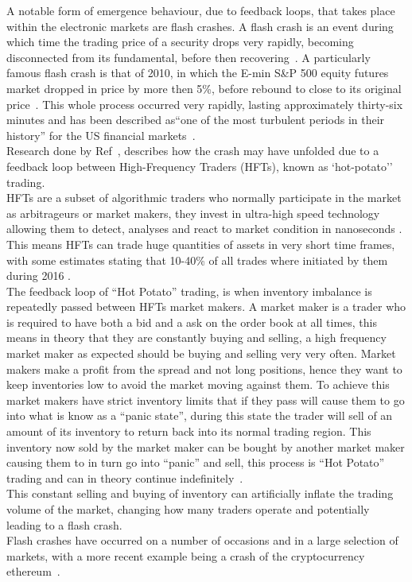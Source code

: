 \documentclass{article}
\begin{document}
A notable form of emergence behaviour, due to feedback loops, that takes place within the electronic markets are flash crashes. A flash crash is an event during which time the trading price of a security drops very rapidly, becoming disconnected from its fundamental, before then recovering~\cite{rareeventflashcrash}. A particularly famous flash crash is that of 2010, in which the E-min S\&P 500 equity futures market dropped in price by more then 5\%, before rebound to close to its original price~\cite{SECreport_delays, rareeventflashcrash}. This whole process occurred very rapidly, lasting approximately thirty-six minutes and has been described as``one of the most turbulent periods in their history'' for the US financial markets~\cite{Impact_hft}.\\
Research done by Ref~\cite{DynamicCoupling_Chris, otherabmflash}, describes how the crash may have unfolded due to a feedback loop between High-Frequency Traders (HFTs), known as `hot-potato'' trading.\\
HFTs are a subset of algorithmic traders who normally participate in the market as arbitrageurs or market makers, they invest in ultra-high speed technology allowing them to detect, analyses and react to market condition in nanoseconds \cite{hftinformation1}. This means HFTs can trade huge quantities of assets in very short time frames, with some estimates stating that 10-40\% of all trades where initiated by them during 2016 \cite{hftmarketparticipation}.\\
The feedback loop of ``Hot Potato'' trading, is when inventory imbalance is repeatedly passed between HFTs market makers. A market maker is a trader who is required to have both a bid and a ask on the order book at all times, this means in theory that they are constantly buying and selling, a high frequency market maker as expected should be buying and selling very very often. Market makers make a profit from the spread and not long positions, hence they want to keep inventories low to avoid the market moving against them. To achieve this market makers have strict inventory limits that if they pass will cause them to go into what is know as a ``panic state'', during this state the trader will sell of an amount of its inventory to return back into its normal trading region. This inventory now sold by the market maker can be bought by another market maker causing them to in turn go into ``panic'' and sell, this process is ``Hot Potato'' trading and can in theory continue indefinitely~\cite{Elias_Paper}.\\
This constant selling and buying of inventory can artificially inflate the trading volume of the market, changing how many traders operate and potentially leading to a flash crash.\\
Flash crashes have occurred on a number of occasions and in a large selection of markets, with a more recent example being a crash of the cryptocurrency ethereum~\cite{cryptocrash}.
\end{document}
